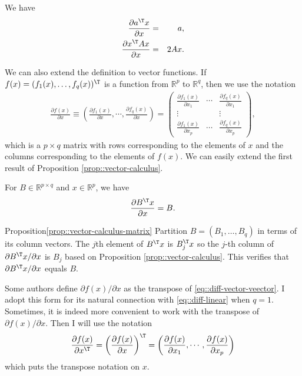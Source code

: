 \begin{proposition}\label{prop::vector-calculus}
We have
\begin{eqnarray*}
\frac{\partial a^{\T} x  }{\partial  x}  &=& a, \\
\frac{ \partial  x^{\T} A x }{ \partial  x} &=& 2 Ax . 
\end{eqnarray*}
\end{proposition}

We can also extend the definition to vector functions. If $f(x) = (f_1(x), \ldots, f_q(x))^{\T}$ is a function from $\mathbb{R}^p$ to $\mathbb{R}^q$, then we use the notation
\begin{eqnarray}
\label{eq::diff-vector-veector}
\frac{\partial f(x)}{\partial  x}  \equiv  \left( \frac{\partial f_1(x)}{\partial  x}  ,\cdots, \frac{\partial f_q(x)}{\partial  x}  \right)
=\begin{pmatrix}
 \frac{\partial f_1(x)}{\partial  x_1} & \cdots &  \frac{\partial f_q(x)}{\partial  x_1} \\
 \vdots & & \vdots \\
  \frac{\partial f_1(x)}{\partial  x_p} & \cdots &  \frac{\partial f_q(x)}{\partial  x_p} 
\end{pmatrix},
\end{eqnarray} 
which is a $p\times q$ matrix with rows corresponding to the elements of $x$ and the columns corresponding to the elements of $f(x)$. 
We can easily extend the first result of Proposition \ref{prop::vector-calculus}.

\begin{proposition}\label{prop::vector-calculus-matrix}
For $B\in \mathbb{R}^{p \times q}$ and $x\in \mathbb{R}^p$, we have 
$$
\frac{\partial B^{\T} x  }{\partial  x}  = B. 
$$
\end{proposition}

 \begin{myproof}{Proposition}{\ref{prop::vector-calculus-matrix}}
 Partition $B= (B_1, \ldots, B_q)$ in terms of its column vectors. 
The $j$th element of $B^{\T}x$ is $B_j^{\T}x$ so the $j$-th column of $ \partial B^{\T}x / \partial x$ is $B_j$ based on Proposition \ref{prop::vector-calculus}. This verifies that $ \partial B^{\T}x / \partial x$ equals $B$. 
 \end{myproof}
 
 
 
 

Some authors define $\partial f(x) / \partial  x$ as the transpose of \eqref{eq::diff-vector-veector}. I adopt this form for its natural  connection with 
\eqref{eq::diff-linear} when $q=1$. 
Sometimes, it is indeed more convenient to work with the transpose of $\partial f(x) / \partial  x$. Then I will use the notation
$$
\frac{\partial f(x)}{\partial  x^{\T}}  = \left( \frac{\partial f(x)}{\partial  x}   \right)^{\T} 
=  \left( \frac{\partial f(x)}{\partial  x_1}  ,\cdots, \frac{\partial f(x)}{\partial  x_p}  \right)
$$
which puts the transpose notation on $x$. 


